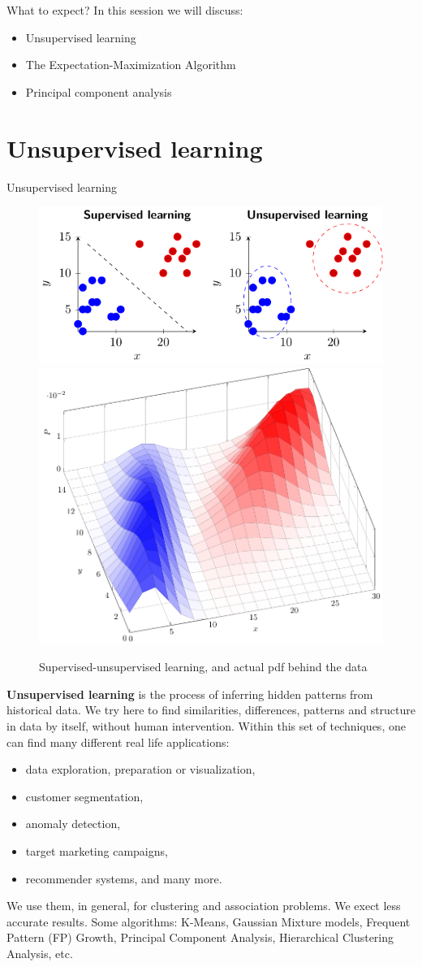 \documentclass{beamer}
\begin{document}
\begin{frame}{What to expect?}
  In this session we will discuss:
  \begin{itemize}
    \item Unsupervised learning
    \item The Expectation-Maximization Algorithm
    \item Principal component analysis
  \end{itemize}
\end{frame}

\section{Unsupervised learning}

\begin{frame}{Unsupervised learning}
    \begin{figure}
        \includegraphics[width=0.7\linewidth]{supervised_unsupervised}
        \includegraphics[width=0.3\linewidth]{2dbivariate}
        \caption{Supervised-unsupervised learning, and actual pdf behind the data}
        \label{fig:supunsup}
    \end{figure}
\end{frame}

\begin{frame}
    {\bf Unsupervised learning} is the process of inferring hidden patterns from historical data. We try here to find similarities, differences, patterns and structure in data by itself, without human intervention. Within this set of techniques, one can find many different real life applications:
    \begin{itemize}
        \item data exploration, preparation or visualization,
        \item customer segmentation,
        \item anomaly detection,
        \item target marketing campaigns,
        \item recommender systems, and many more.
    \end{itemize}
    We use them, in general, for clustering and association problems. We exect less accurate results. Some algorithms: K-Means, Gaussian Mixture models, Frequent Pattern (FP) Growth, Principal Component Analysis, Hierarchical Clustering Analysis, etc.
\end{frame}
\end{document}
